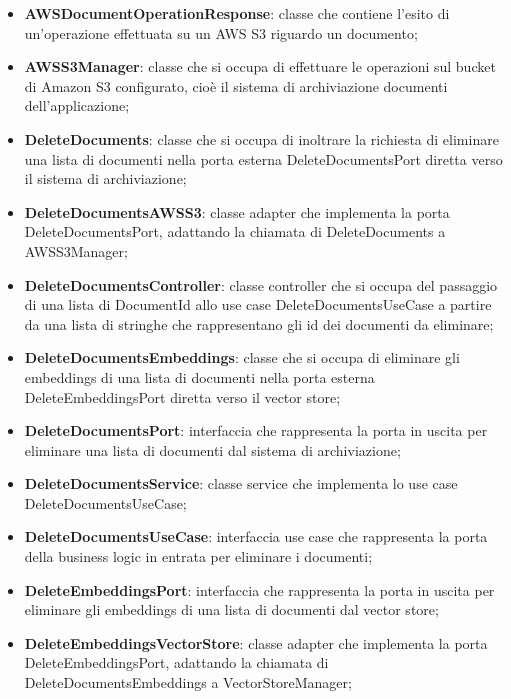\documentclass[10pt, a4paper]{article}
\begin{document}
\begin{itemize}
    \item \label{AWSDocumentOperationResponse}\textbf{AWSDocumentOperationResponse}: classe che contiene l'esito di un'operazione effettuata su un AWS S3 riguardo un documento;
    \item \label{AWSS3Manager}\textbf{AWSS3Manager}: classe che si occupa di effettuare le operazioni sul bucket di Amazon S3 configurato, cioè il sistema di archiviazione documenti dell'applicazione;
    \item \label{DeleteDocuments}\textbf{DeleteDocuments}: classe che si occupa di inoltrare la richiesta di eliminare una lista di documenti nella porta esterna DeleteDocumentsPort diretta verso il sistema di archiviazione;
    \item \label{DeleteDocumentsAWSS3}\textbf{DeleteDocumentsAWSS3}: classe adapter che implementa la porta DeleteDocumentsPort, adattando la chiamata di DeleteDocuments a AWSS3Manager;
    \item \label{DeleteDocumentsController}\textbf{DeleteDocumentsController}: classe controller che si occupa del passaggio di una lista di DocumentId allo use case DeleteDocumentsUseCase a partire da una lista di stringhe che rappresentano gli id dei documenti da eliminare;
    \item \label{DeleteDocumentsEmbeddings}\textbf{DeleteDocumentsEmbeddings}: classe che si occupa di eliminare gli embeddings di una lista di documenti nella porta esterna DeleteEmbeddingsPort diretta verso il vector store;
    \item \label{DeleteDocumentsPort}\textbf{DeleteDocumentsPort}: interfaccia che rappresenta la porta in uscita per eliminare una lista di documenti dal sistema di archiviazione;
    \item \label{DeleteDocumentsService}\textbf{DeleteDocumentsService}: classe service che implementa lo use case DeleteDocumentsUseCase;
    \item \label{DeleteDocumentsUseCase}\textbf{DeleteDocumentsUseCase}: interfaccia use case che rappresenta la porta della business logic in entrata per eliminare i documenti;
    \item \label{DeleteEmbeddingsPort}\textbf{DeleteEmbeddingsPort}: interfaccia che rappresenta la porta in uscita per eliminare gli embeddings di una lista di documenti dal vector store;
    \item \label{DeleteEmbeddingsVectorStore}\textbf{DeleteEmbeddingsVectorStore}: classe adapter che implementa la porta DeleteEmbeddingsPort, adattando la chiamata di DeleteDocumentsEmbeddings a VectorStoreManager;

\end{itemize}
\end{document}
